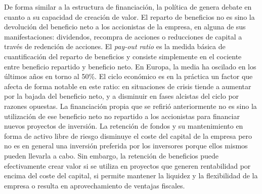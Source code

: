 \documentclass{nuevotema}
\begin{document}
De forma similar a la estructura de financiación, la política de  genera debate en cuanto a su capacidad de creación de valor. El reparto de beneficios no es sino la devolución del beneficio neto a los accionistas de la empresa, en alguna de sus manifestaciones: dividendos, recompra de acciones o reducciones de capital a través de redención de acciones. El \textit{pay-out ratio} es la medida básica de cuantificación del reparto de beneficios y consiste simplemente en el cociente entre beneficio repartido y beneficio neto. En Europa, la media ha oscilado en los últimos años en torno al 50\%. El ciclo económico es en la práctica un factor que afecta de forma notable en este ratio: en situaciones de crisis tiende a aumentar por la bajada del beneficio neto, y a disminuir en fases alcistas del ciclo por razones opuestas. La financiación propia que se refirió anteriormente no es sino la utilización de ese beneficio neto no repartido a los accionistas para financiar nuevos proyectos de inversión. La retención de fondos y su mantenimiento en forma de activo libre de riesgo disminuye el coste del capital de la empresa pero no es en general una inversión preferida por los inversores porque ellos mismos pueden llevarla a cabo. Sin embargo, la retención de beneficios puede efectivamente crear valor si se utiliza en proyectos que generen rentabilidad por encima del coste del capital, si permite mantener la liquidez y la flexibilidad de la empresa o resulta en aprovechamiento de ventajas fiscales.
\end{document}
